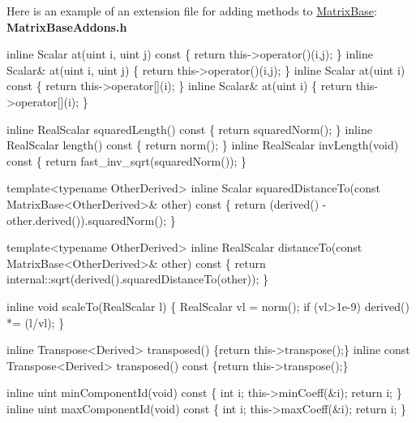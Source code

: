Here is an example of an extension file for adding methods to \hyperlink{group___core___module_class_eigen_1_1_matrix_base}{Matrix\+Base}\+: ~\newline
{\bfseries Matrix\+Base\+Addons.\+h} 
\begin{DoxyCode}
\textcolor{keyword}{inline} Scalar at(uint i, uint j)\textcolor{keyword}{ const }\{ \textcolor{keywordflow}{return} this->operator()(i,j); \}
\textcolor{keyword}{inline} Scalar& at(uint i, uint j) \{ \textcolor{keywordflow}{return} this->operator()(i,j); \}
\textcolor{keyword}{inline} Scalar at(uint i)\textcolor{keyword}{ const }\{ \textcolor{keywordflow}{return} this->operator[](i); \}
\textcolor{keyword}{inline} Scalar& at(uint i) \{ \textcolor{keywordflow}{return} this->operator[](i); \}

\textcolor{keyword}{inline} RealScalar squaredLength()\textcolor{keyword}{ const }\{ \textcolor{keywordflow}{return} squaredNorm(); \}
\textcolor{keyword}{inline} RealScalar length()\textcolor{keyword}{ const }\{ \textcolor{keywordflow}{return} norm(); \}
\textcolor{keyword}{inline} RealScalar invLength(\textcolor{keywordtype}{void})\textcolor{keyword}{ const }\{ \textcolor{keywordflow}{return} fast\_inv\_sqrt(squaredNorm()); \}

\textcolor{keyword}{template}<\textcolor{keyword}{typename} OtherDerived>
\textcolor{keyword}{inline} Scalar squaredDistanceTo(\textcolor{keyword}{const} MatrixBase<OtherDerived>& other)\textcolor{keyword}{ const}
\textcolor{keyword}{}\{ \textcolor{keywordflow}{return} (derived() - other.derived()).squaredNorm(); \}

\textcolor{keyword}{template}<\textcolor{keyword}{typename} OtherDerived>
\textcolor{keyword}{inline} RealScalar distanceTo(\textcolor{keyword}{const} MatrixBase<OtherDerived>& other)\textcolor{keyword}{ const}
\textcolor{keyword}{}\{ \textcolor{keywordflow}{return} internal::sqrt(derived().squaredDistanceTo(other)); \}

\textcolor{keyword}{inline} \textcolor{keywordtype}{void} scaleTo(RealScalar l) \{ RealScalar vl = norm(); \textcolor{keywordflow}{if} (vl>1e-9) derived() *= (l/vl); \}

\textcolor{keyword}{inline} Transpose<Derived> transposed() \{\textcolor{keywordflow}{return} this->transpose();\}
\textcolor{keyword}{inline} \textcolor{keyword}{const} Transpose<Derived> transposed()\textcolor{keyword}{ const }\{\textcolor{keywordflow}{return} this->transpose();\}

\textcolor{keyword}{inline} uint minComponentId(\textcolor{keywordtype}{void})\textcolor{keyword}{ const  }\{ \textcolor{keywordtype}{int} i; this->minCoeff(&i); \textcolor{keywordflow}{return} i; \}
\textcolor{keyword}{inline} uint maxComponentId(\textcolor{keywordtype}{void})\textcolor{keyword}{ const  }\{ \textcolor{keywordtype}{int} i; this->maxCoeff(&i); \textcolor{keywordflow}{return} i; \}


\end{DoxyCode}
